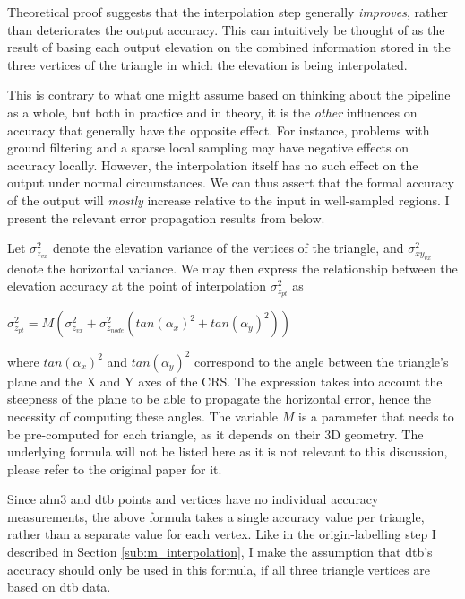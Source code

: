 Theoretical proof suggests that the interpolation step generally \textit{improves}, rather than deteriorates the output accuracy. This can intuitively be thought of as the result of basing each output elevation on the combined information stored in the three vertices of the triangle in which the elevation is being interpolated.

This is contrary to what one might assume based on thinking about the pipeline as a whole, but both in practice and in theory, it is the \textit{other} influences on accuracy that generally have the opposite effect. For instance, problems with ground filtering and a sparse local sampling may have negative effects on accuracy locally. However, the interpolation itself has no such effect on the output under normal circumstances. We can thus assert that the formal accuracy of the output will \textit{mostly} increase relative to the input in well-sampled regions. I present the relevant error propagation results from \cite{fan_etal_2014} below.

Let $\sigma_{z_{vx}}^{2}$ denote the elevation variance of the vertices of the triangle, and $\sigma_{xy_{vx}}^{2}$ denote the horizontal variance. We may then express the relationship between the elevation accuracy at the point of interpolation $\sigma_{z_{pt}}^{2}$ as

$\sigma_{z_{pt}}^{2} = M\left(\sigma_{z_{vx}}^{2} + \sigma_{z_{node}}^{2}\left(tan\left(\alpha_x\right)^2 + tan\left(\alpha_y\right)^2\right)\right)$

where $tan\left(\alpha_x\right)^2$ and $tan\left(\alpha_y\right)^2$ correspond to the angle between the triangle's plane and the X and Y axes of the CRS. The expression takes into account the steepness of the plane to be able to propagate the horizontal error, hence the necessity of computing these angles. The variable $M$ is a parameter that needs to be pre-computed for each triangle, as it depends on their 3D geometry. The underlying formula will not be listed here as it is not relevant to this discussion, please refer to the original paper for it.

Since \ac{ahn3} and \ac{dtb} points and vertices have no individual accuracy measurements, the above formula takes a single accuracy value per triangle, rather than a separate value for each vertex. Like in the origin-labelling step I described in Section \ref{sub:m_interpolation}, I make the assumption that \ac{dtb}'s accuracy should only be used in this formula, if all three triangle vertices are based on \ac{dtb} data.

